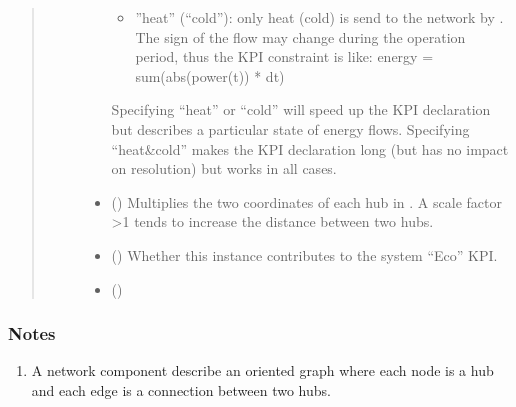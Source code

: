 \documentclass[letterpaper,10pt,english]{sphinxmanual}
\begin{document}
\begin{fulllineitems}
\begin{fulllineitems}
\begin{quote}
\begin{description}
\begin{itemize}
\begin{itemize}
\item {} 
\sphinxAtStartPar
”heat” (“cold”): only heat (cold) is send to the network by .
The sign of the flow may change during the operation period, thus the KPI constraint is like:
energy = sum(abs(power(t)) * dt)

\end{itemize}

\sphinxAtStartPar
Specifying “heat” or “cold” will speed up the KPI declaration but describes a particular state of energy flows.
Specifying “heat\&cold” makes the KPI declaration long (but has no impact on resolution) but works in all cases.


\item {} 
\sphinxAtStartPar
{} (\sphinxstyleliteralemphasis{\sphinxupquote{, }}\sphinxstyleliteralemphasis{\sphinxupquote{, }}) \textendash{} Multiplies the two coordinates of each hub in .
A scale factor \textgreater{}1 tends to increase the distance between two hubs.

\item {} 
\sphinxAtStartPar
{} (\sphinxstyleliteralemphasis{\sphinxupquote{, }}\sphinxstyleliteralemphasis{\sphinxupquote{, }}) \textendash{} Whether this instance contributes to the system “Eco” KPI.

\item {} 
\sphinxAtStartPar
{} (\sphinxstyleliteralemphasis{\sphinxupquote{, }}) \textendash{} 

\end{itemize}

\end{description}\end{quote}
\subsubsection*{Notes}
\begin{enumerate}
%
\item {} 
\sphinxAtStartPar
A network component describe an oriented graph where each node is a hub and each edge is a connection between two hubs.


\end{enumerate}
\end{fulllineitems}
\end{fulllineitems}
\end{document}
